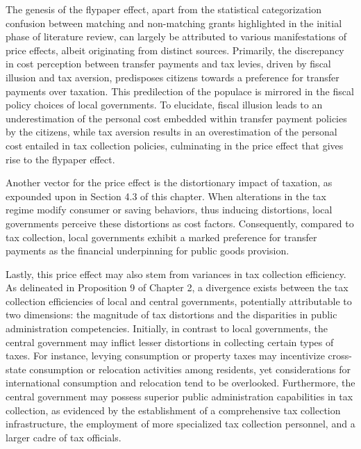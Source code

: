The genesis of the flypaper effect, apart from the statistical categorization confusion between matching and non-matching grants highlighted in the initial phase of literature review, can largely be attributed to various manifestations of price effects, albeit originating from distinct sources. Primarily, the discrepancy in cost perception between transfer payments and tax levies, driven by fiscal illusion and tax aversion, predisposes citizens towards a preference for transfer payments over taxation. This predilection of the populace is mirrored in the fiscal policy choices of local governments. To elucidate, fiscal illusion leads to an underestimation of the personal cost embedded within transfer payment policies by the citizens, while tax aversion results in an overestimation of the personal cost entailed in tax collection policies, culminating in the price effect that gives rise to the flypaper effect.

Another vector for the price effect is the distortionary impact of taxation, as expounded upon in Section 4.3 of this chapter. When alterations in the tax regime modify consumer or saving behaviors, thus inducing distortions, local governments perceive these distortions as cost factors. Consequently, compared to tax collection, local governments exhibit a marked preference for transfer payments as the financial underpinning for public goods provision.

Lastly, this price effect may also stem from variances in tax collection efficiency. As delineated in Proposition 9 of Chapter 2, a divergence exists between the tax collection efficiencies of local and central governments, potentially attributable to two dimensions: the magnitude of tax distortions and the disparities in public administration competencies. Initially, in contrast to local governments, the central government may inflict lesser distortions in collecting certain types of taxes. For instance, levying consumption or property taxes may incentivize cross-state consumption or relocation activities among residents, yet considerations for international consumption and relocation tend to be overlooked. Furthermore, the central government may possess superior public administration capabilities in tax collection, as evidenced by the establishment of a comprehensive tax collection infrastructure, the employment of more specialized tax collection personnel, and a larger cadre of tax officials.


